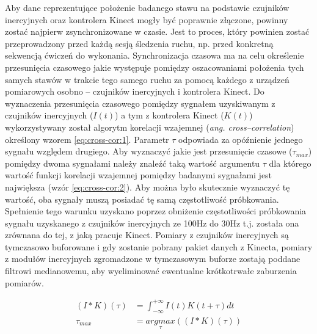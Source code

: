 Aby dane reprezentujące położenie badanego stawu na podstawie czujników inercyjnych oraz kontrolera Kinect mogły być poprawnie złączone, powinny zostać najpierw zsynchronizowane w czasie. Jest to proces, który powinien zostać przeprowadzony przed każdą sesją śledzenia ruchu, np. przed konkretną sekwencją ćwiczeń do wykonania. Synchronizacja czasowa ma na celu określenie przesunięcia czasowego jakie występuje pomiędzy oszacowaniami położenia tych samych stawów w trakcie tego samego ruchu za pomocą każdego z urządzeń pomiarowych osobno -- czujników inercyjnych i kontrolera Kinect. Do wyznaczenia przesunięcia czasowego pomiędzy sygnałem uzyskiwanym z czujników inercyjnych ($I(t)$) a tym z kontrolera Kinect ($K(t)$) wykorzystywany został algorytm korelacji wzajemnej (\emph{ang. cross--correlation}) określony wzorem \eqref{eq:cross-cor:1}. Parametr $\tau$ odpowiada za opóźnienie jednego sygnału względem drugiego. Aby wyznaczyć jakie jest przesunięcie czasowe ($\tau_{max}$) pomiędzy dwoma sygnałami należy znaleźć taką wartość argumentu $\tau$ dla którego wartość funkcji korelacji wzajemnej pomiędzy badanymi sygnałami jest największa (wzór \eqref{eq:cross-cor:2}). Aby można było skutecznie wyznaczyć tę wartość, oba sygnały muszą posiadać tę samą częstotliwość próbkowania. Spełnienie tego warunku uzyskano poprzez obniżenie częstotliwości próbkowania sygnału uzyskanego z czujników inercyjnych ze 100Hz  do 30Hz t.j. została ona zrównana do tej, z jaką pracuje Kinect. Pomiary z czujników inercyjnych są tymczasowo buforowane i gdy zostanie pobrany pakiet danych 
z Kinecta, pomiary z modułów inercyjnych zgromadzone w tymczasowym buforze 
zostają poddane filtrowi medianowemu, aby wyeliminować ewentualne krótkotrwałe zaburzenia pomiarów. 

\begin{subequations}
	\begin{align}
		(I \ast K)(\tau) & = \int_{-\infty}^{+\infty}I(t)K(t+\tau)dt\label{eq:cross-cor:1}   \\
		\tau_{max}       & = \underset{\tau}{argmax}((I \ast K)(\tau))\label{eq:cross-cor:2} 
	\end{align}
	\label{eq:cross-cor}
\end{subequations}

